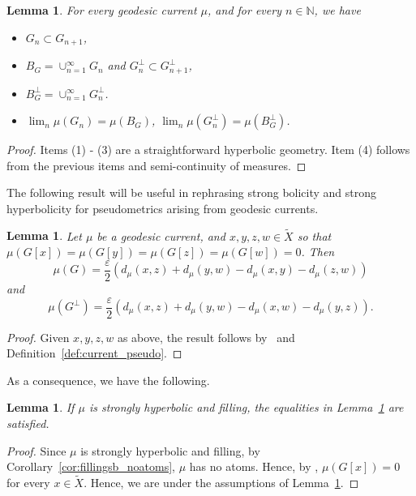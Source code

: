 \documentclass[12pt]{amsart}
\numberwithin{equation}{section}
\numberwithin{figure}{section}
\newtheorem{lemma}[equation]{Lemma}
\theoremstyle{definition}
\theoremstyle{plain}
\newcommand*{\wt}[1]{\widetilde{#1}}
\renewcommand{\epsilon}{\varepsilon}
\begin{document}
\begin{lemma} For every geodesic current $\mu$, and for every $n \in \mathbb{N}$, we have
\begin{itemize}
\item $G_n \subset G_{n+1}$, 
\item $B_G=\cup_{n=1}^\infty G_n$ and $G_n^\perp \subset G_{n+1}^\perp$, 
\item $B_G^\perp=\cup_{n=1}^\infty G_n^\perp$.
\item $\lim_n \mu(G_n) = \mu(B_G)$, $\lim_n \mu(G_n^\perp) = \mu(B^\perp_G)$.
\end{itemize}
\label{lem:nested_transversals}
\end{lemma}
\begin{proof}
Items (1) - (3) are a straightforward hyperbolic geometry.
Item (4) follows from the previous items and semi-continuity of measures.
\end{proof}

The following result will be useful in rephrasing strong bolicity and strong hyperbolicity for pseudometrics arising from geodesic currents.

\begin{lemma}
    Let $\mu$ be a geodesic current, and $x,y,z,w \in \wt{X}$ so that $\mu(G[x])=\mu(G[y])=\mu(G[z])=\mu(G[w])=0$.
    Then 
    \[
\mu(G) =\frac{\epsilon}{2}(d_\mu(x,z) + d_\mu(y,w)- d_\mu(x,y) - d_\mu(z,w))
\]
and
\[
\mu(G^\perp) = \frac{\epsilon}{2}(d_\mu(x,z) + d_\mu(y,w)- d_\mu(x,w) - d_\mu(y,z)).
\]
\label{lem:transversal_vs_distances}
\end{lemma}
\begin{proof}
Given $x,y,z,w$ as above, the result follows by~\cite[Lemma~6.2]{DRMG23:Duals} and Definition~\ref{def:current_pseudo}.
\end{proof}

As a consequence, we have the following.

\begin{lemma}\label{lem:sh_transversal_vs_distances}
If $\mu$ is strongly hyperbolic and filling, the equalities in Lemma~\ref{lem:transversal_vs_distances} are satisfied.
\end{lemma}
\begin{proof}
Since $\mu$ is strongly hyperbolic and filling, by Corollary~\ref{cor:fillingsb_noatoms}, $\mu$ has no atoms. Hence, by \cite[Proposition~4.6]{DRMG23:Duals}, $\mu(G[x])=0$ for every $x \in \wt{X}$. Hence, we are under the assumptions of Lemma~\ref{lem:transversal_vs_distances}.
\end{proof}
\end{document}
